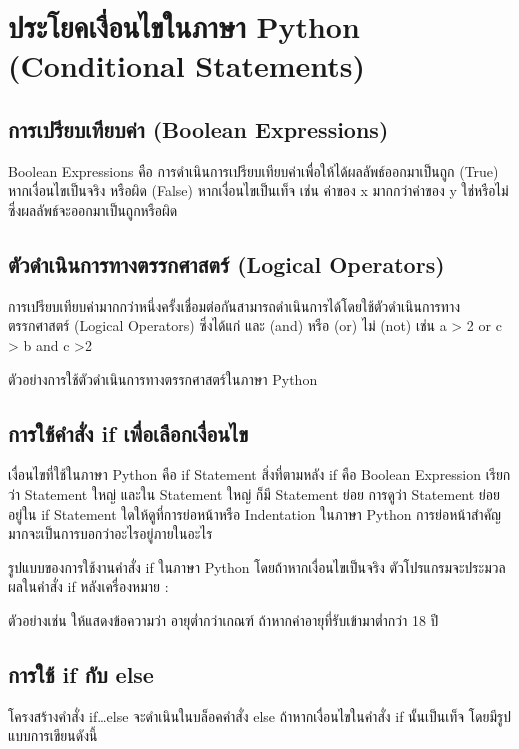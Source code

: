  \chapter {ประโยคเงื่อนไขในภาษา Python (Conditional Statements)}

\section{การเปรียบเทียบค่า (Boolean Expressions)}

Boolean Expressions คือ การดำเนินการเปรียบเทียบค่าเพื่อให้ได้ผลลัพธ์ออกมาเป็นถูก (True) หากเงื่อนไขเป็นจริง หรือผิด (False) หากเงื่อนไขเป็นเท็จ เช่น ค่าของ x มากกว่าค่าของ y ใช่หรือไม่ ซึ่งผลลัพธ์จะออกมาเป็นถูกหรือผิด

\section{ตัวดำเนินการทางตรรกศาสตร์ (Logical Operators)}

การเปรียบเทียบค่ามากกว่าหนึ่งครั้งเชื่อมต่อกันสามารถดำเนินการได้โดยใช้ตัวดำเนินการทาง ตรรกศาสตร์ (Logical Operators) ซึ่งได้แก่ และ (and) หรือ (or) ไม่ (not) เช่น a > 2 or c > b and c >2

ตัวอย่างการใช้ตัวดำเนินการทางตรรกศาสตร์ในภาษา Python

\section{การใช้คำสั่ง if เพื่อเลือกเงื่อนไข}

เงื่อนไขที่ใช้ในภาษา Python คือ if Statement สิ่งที่ตามหลัง if คือ Boolean Expression เรียกว่า Statement ใหญ่ และใน Statement ใหญ่ ก็มี Statement ย่อย การดูว่า Statement ย่อยอยู่ใน if Statement ใดให้ดูที่การย่อหน้าหรือ Indentation ในภาษา Python การย่อหน้าสำคัญมากจะเป็นการบอกว่าอะไรอยู่ภายในอะไร 

รูปแบบของการใช้งานคำสั่ง if ในภาษา Python โดยถ้าหากเงื่อนไขเป็นจริง ตัวโปรแกรมจะประมวลผลในคำสั่ง if หลังเครื่องหมาย : 

ตัวอย่างเช่น ให้แสดงข้อความว่า อายุต่ำกว่าเกณฑ์ ถ้าหากค่าอายุที่รับเข้ามาต่ำกว่า 18 ปี

\section{การใช้ if กับ else}

โครงสร้างคำสั่ง if…else จะดำเนินในบล็อคคำสั่ง else ถ้าหากเงื่อนไขในคำสั่ง if นั้นเป็นเท็จ โดยมีรูปแบบการเขียนดังนี้

